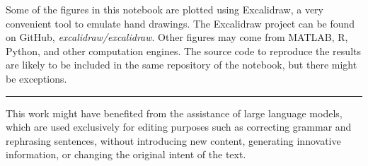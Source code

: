 Some of the figures in this notebook are plotted using Excalidraw, a very convenient tool to emulate hand drawings. The Excalidraw project can be found on GitHub, \textit{excalidraw/excalidraw}. Other figures may come from MATLAB, R, Python, and other computation engines. The source code to reproduce the results are likely to be included in the same repository of the notebook, but there might be exceptions.

\vspace{0.1in}
\noindent \rule{1in}{0.4pt}
\vspace{0.1in}

This work might have benefited from the assistance of large language models, which are used exclusively for editing purposes such as correcting grammar and rephrasing sentences, without introducing new content, generating innovative information, or changing the original intent of the text.

